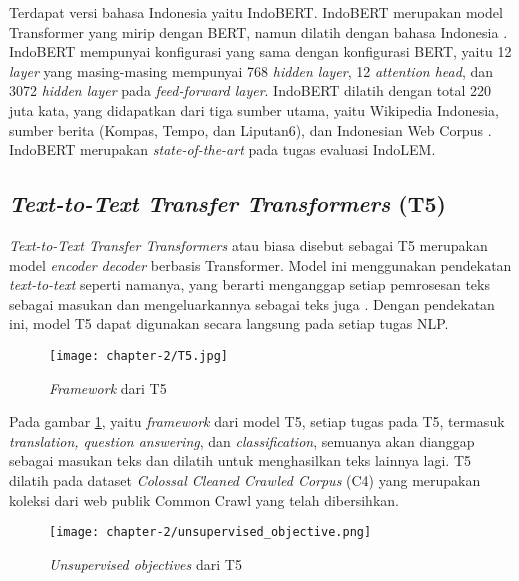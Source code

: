 Terdapat versi bahasa Indonesia yaitu IndoBERT. IndoBERT merupakan model Transformer yang mirip dengan BERT, namun dilatih dengan bahasa Indonesia \parencite{indolem}. IndoBERT mempunyai konfigurasi yang sama dengan konfigurasi BERT, yaitu 12 \textit{layer} yang masing-masing mempunyai 768 \textit{hidden layer}, 12 \textit{attention head}, dan 3072 \textit{hidden layer} pada \textit{feed-forward layer}. IndoBERT dilatih dengan total 220 juta kata, yang didapatkan dari tiga sumber utama, yaitu Wikipedia Indonesia, sumber berita (Kompas, Tempo, dan Liputan6), dan Indonesian Web Corpus \parencite{indolem}. IndoBERT merupakan \textit{state-of-the-art} pada tugas evaluasi IndoLEM.

\subsection{\textit{Text-to-Text Transfer Transformers} (T5)}

\textit{Text-to-Text Transfer Transformers} atau biasa disebut sebagai T5 merupakan model \textit{encoder decoder} berbasis Transformer. Model ini menggunakan pendekatan \textit{text-to-text} seperti namanya, yang berarti menganggap setiap pemrosesan teks sebagai masukan dan mengeluarkannya sebagai teks juga \parencite{T5}. Dengan pendekatan ini, model T5 dapat digunakan secara langsung pada setiap tugas NLP.

\begin{figure}[ht]
    \vspace{0.25cm}
    \centering
    \texttt{[image: chapter-2/T5.jpg]}
    \caption{\textit{Framework} dari T5 \parencite{T5}}
    \label{fig:T5}
\end{figure}

Pada gambar \ref{fig:T5}, yaitu \textit{framework} dari model T5, setiap tugas pada T5, termasuk \textit{translation, question answering}, dan \textit{classification}, semuanya akan dianggap sebagai masukan teks dan dilatih untuk menghasilkan teks lainnya lagi. T5 dilatih pada dataset \textit{Colossal Cleaned Crawled Corpus} (C4) yang merupakan koleksi dari web publik Common Crawl yang telah dibersihkan.

\begin{figure}[ht]
    \vspace{0.25cm}
    \centering
    \texttt{[image: chapter-2/unsupervised\_objective.png]}
    \caption{\textit{Unsupervised objectives} dari T5 \parencite{T5}}
    \label{fig:unsupervised-T5}
\end{figure}

